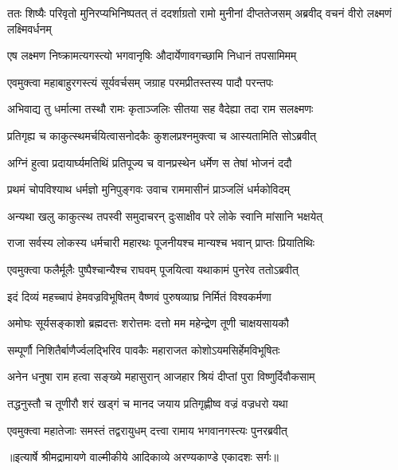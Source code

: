 \threelineshloka
{ततः शिष्यैः परिवृतो मुनिरप्यभिनिष्पतत्}
{तं ददर्शाग्रतो रामो मुनीनां दीप्ततेजसम्}
{अब्रवीद् वचनं वीरो लक्ष्मणं लक्ष्मिवर्धनम्} %

\twolineshloka
{एष लक्ष्मण निष्क्रामत्यगस्त्यो भगवानृषिः}
{औदार्येणावगच्छामि निधानं तपसामिमम्} %

\twolineshloka
{एवमुक्त्वा महाबाहुरगस्त्यं सूर्यवर्चसम्}
{जग्राह परमप्रीतस्तस्य पादौ परन्तपः} %

\twolineshloka
{अभिवाद्य तु धर्मात्मा तस्थौ रामः कृताञ्जलिः}
{सीतया सह वैदेह्या तदा राम सलक्ष्मणः} %

\twolineshloka
{प्रतिगृह्य च काकुत्स्थमर्चयित्वासनोदकैः}
{कुशलप्रश्नमुक्त्वा च आस्यतामिति सोऽब्रवीत्} %

\twolineshloka
{अग्निं हुत्वा प्रदायार्घ्यमतिथिं प्रतिपूज्य च}
{वानप्रस्थेन धर्मेण स तेषां भोजनं ददौ} %

\twolineshloka
{प्रथमं चोपविश्याथ धर्मज्ञो मुनिपुङ्गवः}
{उवाच राममासीनं प्राञ्जलिं धर्मकोविदम्} %

\twolineshloka
{अन्यथा खलु काकुत्स्थ तपस्वी समुदाचरन्}
{दुःसाक्षीव परे लोके स्वानि मांसानि भक्षयेत्} %

\twolineshloka
{राजा सर्वस्य लोकस्य धर्मचारी महारथः}
{पूजनीयश्च मान्यश्च भवान् प्राप्तः प्रियातिथिः} %

\twolineshloka
{एवमुक्त्वा फलैर्मूलैः पुष्पैश्चान्यैश्च राघवम्}
{पूजयित्वा यथाकामं पुनरेव ततोऽब्रवीत्} %

\twolineshloka
{इदं दिव्यं महच्चापं हेमवज्रविभूषितम्}
{वैष्णवं पुरुषव्याघ्र निर्मितं विश्वकर्मणा} %

\twolineshloka
{अमोघः सूर्यसङ्काशो ब्रह्मदत्तः शरोत्तमः}
{दत्तो मम महेन्द्रेण तूणी चाक्षयसायकौ} %

\twolineshloka
{सम्पूर्णौ निशितैर्बाणैर्ज्वलद्भिरिव पावकैः}
{महाराजत कोशोऽयमसिर्हेमविभूषितः} %

\twolineshloka
{अनेन धनुषा राम हत्वा सङ्ख्ये महासुरान्}
{आजहार श्रियं दीप्तां पुरा विष्णुर्दिवौकसाम्} %

\twolineshloka
{तद्धनुस्तौ च तूणीरौ शरं खड्गं च मानद}
{जयाय प्रतिगृह्णीष्व वज्रं वज्रधरो यथा} %

\twolineshloka
{एवमुक्त्वा महातेजाः समस्तं तद्वरायुधम्}
{दत्त्वा रामाय भगवानगस्त्यः पुनरब्रवीत्} %


{॥इत्यार्षे श्रीमद्रामायणे वाल्मीकीये आदिकाव्ये अरण्यकाण्डे एकादशः सर्गः॥}


